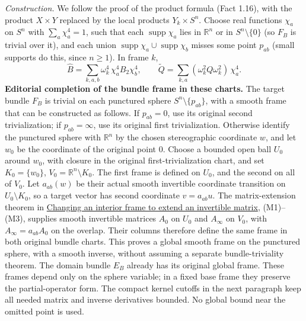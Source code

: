 \documentclass[
  11pt,
]{article}
\begin{document}
\emph{Construction.} We follow the proof of the product formula (Fact
1.16), with the product \(X\times Y\) replaced by the local products
\(Y_k\times S^n\). Choose real functions \(\chi_a\) on \(S^n\) with
\(\sum_a\chi_a^4=1\), such that each \(\operatorname{supp}\chi_a\) lies
in \(\mathbb R^n\) or in \(S^n\setminus\{0\}\) (so \(F_B\) is trivial
over it), and each union
\(\operatorname{supp}\chi_a\cup\operatorname{supp}\chi_b\) misses some
point \(p_{ab}\) (small supports do this, since \(n\ge1\)). In frame
\(k\), \[
\hat B=\sum_{k,a,b}\omega_k^4\,\chi_a^4B_2\chi_b^4,\qquad \tilde Q=\sum_{k,a}(\omega_k^2Q\omega_k^2)\,\chi_a^4 .
\] \textbf{Editorial completion of the bundle frame in these charts.}
The target bundle \(F_B\) is trivial on each punctured sphere
\(S^n\setminus\{p_{ab}\}\), with a smooth frame that can be constructed
as follows. If \(p_{ab}=0\), use its original second trivialization; if
\(p_{ab}=\infty\), use its original first trivialization. Otherwise
identify the punctured sphere with \(\mathbb R^n\) by the chosen
stereographic coordinate \(w\), and let \(w_0\) be the coordinate of the
original point \(0\). Choose a bounded open ball \(U_0\) around \(w_0\),
with closure in the original first-trivialization chart, and set
\(K_0=\{w_0\}\), \(V_0=\mathbb R^n\setminus K_0\). The first frame is
defined on \(U_0\), and the second on all of \(V_0\). Let \(a_{ab}(w)\)
be their actual smooth invertible coordinate transition on
\(U_0\setminus K_0\), so a target vector has second coordinate
\(v=a_{ab}u\). The matrix-extension theorem in
\href{matrix-extension.pdf}{Changing an interior frame to extend an
invertible matrix}, (M1)--(M3), supplies smooth invertible matrices
\(A_0\) on \(U_0\) and \(A_\infty\) on \(V_0\), with
\(A_\infty=a_{ab}A_0\) on the overlap. Their columns therefore define
the same frame in both original bundle charts. This proves a global
smooth frame on the punctured sphere, with a smooth inverse, without
assuming a separate bundle-triviality theorem. The domain bundle \(E_B\)
already has its original global frame. These frames depend only on the
sphere variable; in a fixed base frame they preserve the
partial-operator form. The compact kernel cutoffs in the next paragraph
keep all needed matrix and inverse derivatives bounded. No global bound
near the omitted point is used.
\end{document}
